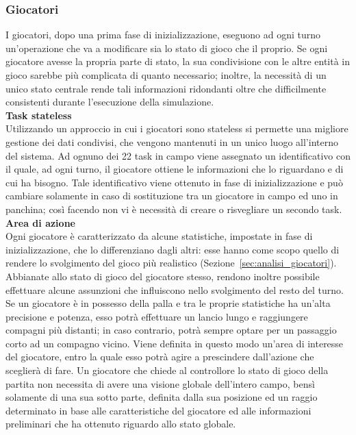 \subsubsection{Giocatori}
\label{sec:analisi_concorrenza_giocatori}

I giocatori, dopo una prima fase di inizializzazione, eseguono ad ogni turno un'operazione che va a modificare sia lo stato di gioco che il proprio. Se ogni giocatore avesse la propria parte di stato, la sua condivisione con le altre entità in gioco sarebbe più complicata di quanto necessario; inoltre, la necessità di un unico stato centrale rende tali informazioni ridondanti oltre che difficilmente consistenti durante l'esecuzione della simulazione.\\

\textbf{Task stateless}\\

Utilizzando un approccio in cui i giocatori sono stateless si permette una migliore gestione dei dati condivisi, che vengono mantenuti in un unico luogo all'interno del sistema. Ad ognuno dei 22 task in campo viene assegnato un identificativo con il quale, ad ogni turno, il giocatore ottiene le informazioni che lo riguardano e di cui ha bisogno. Tale identificativo viene ottenuto in fase di inizializzazione e può cambiare solamente in caso di sostituzione tra un giocatore in campo ed uno in panchina; così facendo non vi è necessità di creare o risvegliare un secondo task.\\

\textbf{Area di azione}\\

Ogni giocatore è caratterizzato da alcune statistiche, impostate in fase di inizializzazione, che lo differenziano dagli altri: esse hanno come scopo quello di rendere lo svolgimento del gioco più realistico (Sezione~\ref{sec:analisi_giocatori}). Abbianate allo stato di gioco del giocatore stesso, rendono inoltre possibile effettuare alcune assunzioni che influiscono nello svolgimento del resto del turno.\\

Se un giocatore è in possesso della palla e tra le proprie statistiche ha un'alta precisione e potenza, esso potrà effettuare un lancio lungo e raggiungere compagni più distanti; in caso contrario, potrà sempre optare per un passaggio corto ad un compagno vicino. Viene definita in questo modo un'area di interesse del giocatore, entro la quale esso potrà agire a prescindere dall'azione che sceglierà di fare. Un giocatore che chiede al controllore lo stato di gioco della partita non necessita di avere una visione globale dell'intero campo, bensì solamente di una sua sotto parte, definita dalla sua posizione ed un raggio determinato in base alle caratteristiche del giocatore ed alle informazioni preliminari che ha ottenuto riguardo allo stato globale.\\

